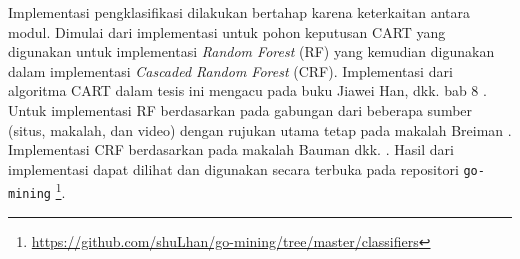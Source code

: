 Implementasi pengklasifikasi dilakukan bertahap karena keterkaitan antara
modul.
Dimulai dari implementasi untuk pohon keputusan CART yang digunakan untuk
implementasi \textit{Random Forest} (RF) yang kemudian digunakan dalam
implementasi \textit{Cascaded Random Forest} (CRF).
Implementasi dari algoritma CART dalam tesis ini mengacu pada buku Jiawei Han,
dkk. bab 8 \cite{han2011data}.
Untuk implementasi RF berdasarkan pada gabungan dari beberapa sumber (situs,
makalah, dan video) dengan rujukan utama tetap pada makalah Breiman
\cite{breiman2001random}.
Implementasi CRF berdasarkan pada makalah Bauman dkk.
\cite{baumann2013cascaded}.
Hasil dari implementasi dapat dilihat dan digunakan secara terbuka pada
repositori \texttt{go-mining}
\footnote{\url{https://github.com/shuLhan/go-mining/tree/master/classifiers}}.
